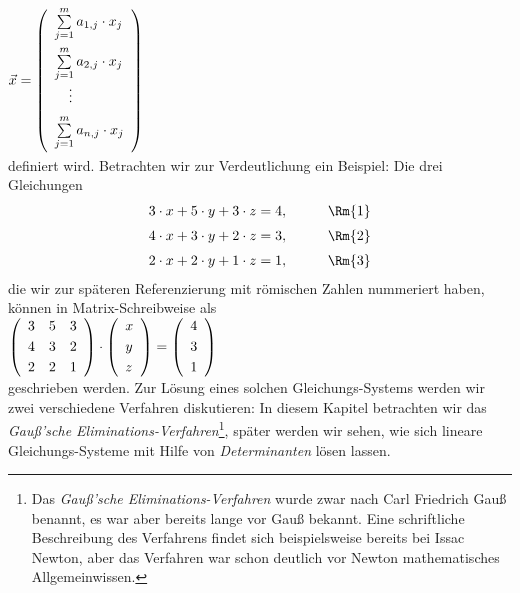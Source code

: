 \hspace*{1.3cm}
$\vec{x} = \left(
  \begin{array}[c]{l}
     \sum\limits_{j=1}^m a_{1,j} \cdot x_j    \\[0.4cm]
     \sum\limits_{j=1}^m a_{2,j} \cdot x_j    \\
     \quad\vdots                                   \\[0.2cm]
     \sum\limits_{j=1}^m a_{n,j} \cdot x_j    \\[0.4cm]
  \end{array}
 \right)
$ 
\\[0.2cm]
definiert wird.  Betrachten wir zur Verdeutlichung ein Beispiel:  Die drei Gleichungen
\begin{equation}
  \label{eq:gauss0} 
\begin{array}[c]{lllll}
  3 \cdot x + 5 \cdot y + 3 \cdot z = 4, & \quad & \Rm{1} \\[0.2cm]
  4 \cdot x + 3 \cdot y + 2 \cdot z = 3, & \quad & \Rm{2} \\[0.2cm]
  2 \cdot x + 2 \cdot y + 1 \cdot z = 1, & \quad & \Rm{3}
\end{array}
\end{equation}
die wir zur späteren Referenzierung mit römischen Zahlen nummeriert haben,
können in Matrix-Schreibweise als
\\[0.2cm]
\hspace*{1.3cm}
$
\left(
\begin{array}[c]{lll}
  3  & 5 & 3  \\[0.1cm]
  4  & 3 & 2  \\[0.1cm]
  2  & 2 & 1  
\end{array}
\right) \cdot \left(
  \begin{array}[c]{lll}
    x \\[0.1cm] y \\[0.1cm] z
  \end{array}
\right) = \left(
  \begin{array}[c]{lll}
    4 \\[0.1cm] 3 \\[0.1cm] 1
  \end{array}
\right)
$
\\[0.2cm]
geschrieben werden.  
Zur Lösung eines solchen Gleichungs-Systems
werden wir zwei verschiedene Verfahren diskutieren:  In diesem Kapitel betrachten wir das 
\emph{Gauß'sche Eliminations-Verfahren}\footnote{
  Das \emph{Gauß'sche Eliminations-Verfahren} wurde zwar nach Carl Friedrich Gauß benannt,
  es war aber bereits lange vor Gauß bekannt.  Eine schriftliche Beschreibung des Verfahrens  findet
  sich beispielsweise bereits bei Issac Newton, aber das Verfahren war schon deutlich vor Newton 
  mathematisches Allgemeinwissen.},
später werden wir sehen, wie sich lineare Gleichungs-Systeme mit Hilfe von
\emph{Determinanten} lösen lassen.   


